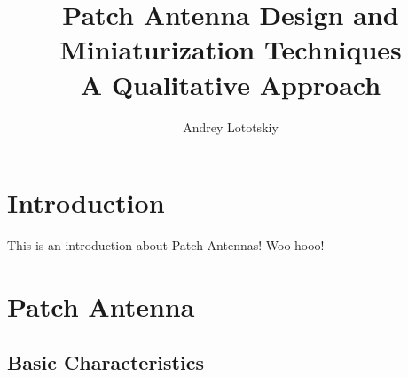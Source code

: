 \documentclass[12pt]{article}
\title{Patch Antenna Design and Miniaturization Techniques \\A Qualitative Approach}
\author{Andrey Lototskiy}
\begin{document}
\maketitle

\section{Introduction}
This is an introduction about Patch Antennas! Woo hooo! \cite{balanis2016antenna}
\section{Patch Antenna}

\subsection{Basic Characteristics}

\newpage


\end{document}
